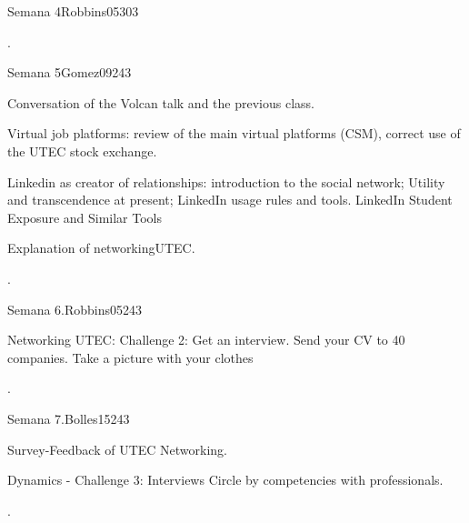 \begin{syllabus}
\begin{unit}{Semana 4}{Robbins05}{30}{3}
   \begin{unitgoals}
      \item .
   \end{unitgoals}
\end{unit}

\begin{unit}{Semana 5}{Gomez09}{24}{3}
   \begin{topics}
      \item Conversation of the Volcan talk and the previous class.
      \item Virtual job platforms: review of the main virtual platforms (CSM), correct use of the UTEC stock exchange.
      \item Linkedin as creator of relationships: introduction to the social network; Utility and transcendence at present; LinkedIn usage rules and tools. LinkedIn Student Exposure and Similar Tools
      \item Explanation of networkingUTEC.   
   \end{topics}

   \begin{unitgoals}
      \item .
   \end{unitgoals}
\end{unit}

\begin{unit}{Semana 6.}{Robbins05}{24}{3}
   \begin{topics}
      \item Networking UTEC: Challenge 2: Get an interview. Send your CV to 40 companies. Take a picture with your clothes     
   \end{topics}

   \begin{unitgoals}
      \item .
   \end{unitgoals}
\end{unit}

\begin{unit}{Semana 7.}{Bolles15}{24}{3}
   \begin{topics}
      \item Survey-Feedback of UTEC Networking.
      \item Dynamics - Challenge 3: Interviews Circle by competencies with professionals.
   \end{topics}

   \begin{unitgoals}
      \item .
   \end{unitgoals}
\end{unit}


\end{syllabus}
